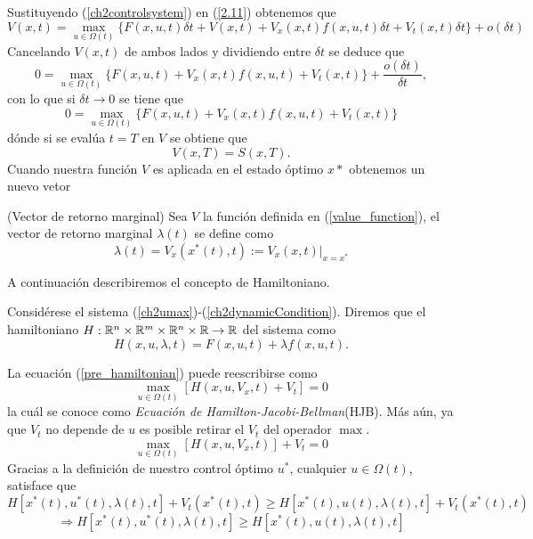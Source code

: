  Sustituyendo (\ref{ch2controlsystem}) en (\ref{2.11}) obtenemos que 
 \begin{equation}
     V(x,t) = \max_{u\in \Omega(t)} \{F(x,u,t)\delta t + V(x,t) + V_x(x,t)f(x,u,t)\delta t + V_t(x,t)\delta t\} + o(\delta t)
 \end{equation}
Cancelando $V(x,t)$ de ambos lados y dividiendo entre $\delta t$ se deduce que
\begin{equation}
    0 = \max_{u\in \Omega(t)} \{F(x,u,t) + V_x(x,t)f(x,u,t) + V_t(x,t)\} + \frac{o(\delta t)}{\delta t},
\end{equation}
con lo que si $\delta t \to 0$ se tiene que 
\begin{equation}
    \label{pre_hamiltonian}
    0 = \max_{u\in \Omega(t)} \{F(x,u,t) + V_x(x,t)f(x,u,t) + V_t(x,t)\}
\end{equation}
dónde si se evalúa $t=T$ en $V$ se obtiene que 
\begin{equation}
    V(x,T) = S(x,T).
\end{equation}
Cuando nuestra función $V$ es aplicada en el estado óptimo $x*$ obtenemos un nuevo vetor
\begin{definition}(Vector de retorno marginal)
    Sea $V$ la función definida en (\ref{value_function}), el vector de retorno marginal $\lambda(t)$ se define como
    \begin{equation}
        \lambda(t) = V_x(x^*(t),t):=V_x(x,t)|_{x=x^*}
    \end{equation}
\end{definition}
A continuación describiremos el concepto de Hamiltoniano.
\begin{definition}
    Considérese el sistema (\ref{ch2umax})-(\ref{ch2dynamicCondition}). Diremos que el hamiltoniano $H: \mathbb R^n\times \mathbb R^m \times \mathbb R^n \times \mathbb R \to \mathbb R$ del sistema como 
    \begin{equation}
        H(x,u,\lambda, t) = F(x,u,t) + \lambda f(x,u,t).
    \end{equation}
\end{definition}
La ecuación (\ref{pre_hamiltonian}) puede reescribirse como
\begin{equation}
    \max_{u\in \Omega(t)}[H(x,u,V_x,t) + V_t] = 0
\end{equation}
la cuál se conoce como \textsl{Ecuación de Hamilton-Jacobi-Bellman}(HJB). Más aún, ya que $V_t$ no depende de $u$ es posible retirar el $V_t$ del operador $\max$.
\begin{equation}
    \label{HJB}
    \max_{u\in \Omega(t)}[H(x,u,V_x,t)] + V_t = 0
\end{equation}
Gracias a la definición de nuestro control óptimo $u^*$, cualquier $u\in \Omega(t)$, satisface que
\begin{equation}
    H[x^*(t), u^*(t), \lambda(t), t] + V_t(x^*(t),t ) \geq H[x^*(t), u(t), \lambda(t), t] + V_t(x^*(t),t )
\end{equation}
\begin{equation}
    \Rightarrow H[x^*(t), u^*(t), \lambda(t), t]  \geq H[x^*(t), u(t), \lambda(t), t] 
\end{equation}

